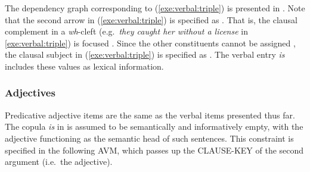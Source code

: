 



\noindent The dependency graph corresponding to
(\ref{exe:verbal:triple}) is presented in
. Note that the second arrow in
(\ref{exe:verbal:triple}) is specified as . That is, the
clausal complement in a \textit{wh}-cleft (e.g.\ \textit{they caught
  her without a license} in \ref{exe:verbal:triple}) is focused
\citep{kim:07}. Since the other constituents cannot be
assigned , the clausal subject in (\ref{exe:verbal:triple})
is specified as . The verbal entry \textit{is} includes
these values as lexical information.







\subsubsection{Adjectives}
\label{10:sssec:adjectives}


Predicative adjective items are the same as the verbal items presented
thus far. The copula \textit{is} in  is assumed
to be semantically and informatively empty, with the adjective
functioning as the semantic head of such sentences. This constraint is
specified in the following AVM, which passes up the CLAUSE-KEY of the
second argument (i.e.\ the adjective).



